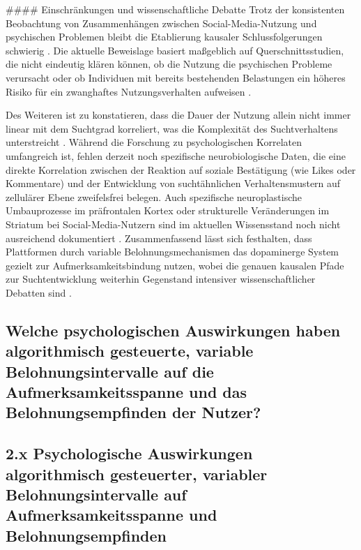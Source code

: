 \documentclass[11pt,a4paper]{article}
\begin{document}
\#\#\#\# Einschränkungen und wissenschaftliche Debatte Trotz der konsistenten Beobachtung von Zusammenhängen zwischen Social-Media-Nutzung und psychischen Problemen bleibt die Etablierung kausaler Schlussfolgerungen schwierig \autocite{openalex_W2924664363,crossref_10_3389_fpsyg_2026_1840700}. Die aktuelle Beweislage basiert maßgeblich auf Querschnittsstudien, die nicht eindeutig klären können, ob die Nutzung die psychischen Probleme verursacht oder ob Individuen mit bereits bestehenden Belastungen ein höheres Risiko für ein zwanghaftes Nutzungsverhalten aufweisen \autocite{openalex_W2924664363,crossref_10_3389_fpsyg_2026_1840700}.

Des Weiteren ist zu konstatieren, dass die Dauer der Nutzung allein nicht immer linear mit dem Suchtgrad korreliert, was die Komplexität des Suchtverhaltens unterstreicht \autocite{crossref_10_55032_atskj_psychol_2020_1103}. Während die Forschung zu psychologischen Korrelaten umfangreich ist, fehlen derzeit noch spezifische neurobiologische Daten, die eine direkte Korrelation zwischen der Reaktion auf soziale Bestätigung (wie Likes oder Kommentare) und der Entwicklung von suchtähnlichen Verhaltensmustern auf zellulärer Ebene zweifelsfrei belegen. Auch spezifische neuroplastische Umbauprozesse im präfrontalen Kortex oder strukturelle Veränderungen im Striatum bei Social-Media-Nutzern sind im aktuellen Wissensstand noch nicht ausreichend dokumentiert \autocite{crossref_10_51473_rcmos_v1i2_2025_1736,doaj_10febcbb5e60420699a1d4570a075832}. Zusammenfassend lässt sich festhalten, dass Plattformen durch variable Belohnungsmechanismen das dopaminerge System gezielt zur Aufmerksamkeitsbindung nutzen, wobei die genauen kausalen Pfade zur Suchtentwicklung weiterhin Gegenstand intensiver wissenschaftlicher Debatten sind \autocite{crossref_10_51473_rcmos_v1i2_2025_1736,openalex_W2924664363}.

\subsection{Welche psychologischen Auswirkungen haben algorithmisch gesteuerte, variable Belohnungsintervalle auf die Aufmerksamkeitsspanne und das Belohnungsempfinden der Nutzer?}

\subsection{2.x Psychologische Auswirkungen algorithmisch gesteuerter, variabler Belohnungsintervalle auf Aufmerksamkeitsspanne und Belohnungsempfinden}
\end{document}

